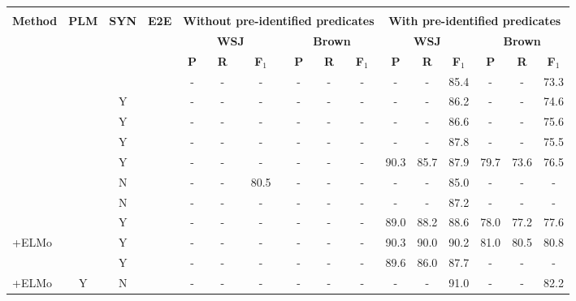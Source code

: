 

\begin{table*}[t]
\fontsize{8.5}{9}\selectfont
\setlength{\tabcolsep}{1.3mm}

\vspace{-2mm}
\begin{center}
\begin{tabular}{lccccccccccccccc}
\Xhline{0.08em}
\rowcolor{blue!15}
\multicolumn{16}{c}{\textit{\textbf{Dependency-based SRL}}} \\
\multirow{4}{*}{\bf Method} & \multirow{4}{*}{\bf PLM} & \multirow{4}{*}{\bf SYN} & \multirow{4}{*}{\bf E2E} & \multicolumn{6}{c}{\bf Without pre-identified predicates} & \multicolumn{6}{c}{\bf With pre-identified predicates}\\
\cmidrule(lr){5-10}\cmidrule(lr){11-16}
& & & & \multicolumn{3}{c}{\bf WSJ} & \multicolumn{3}{c}{\bf Brown} & \multicolumn{3}{c}{\bf WSJ} & \multicolumn{3}{c}{\bf Brown} \\
\cmidrule(lr){5-7}\cmidrule(lr){8-10}\cmidrule(lr){11-13}\cmidrule(lr){14-16}
 & & & & \bf P & \bf R & \bf F$_1$ & \bf P & \bf R & \bf F$_1$ & \bf P & \bf R & \bf F$_1$ & \bf P & \bf R & \bf F$_1$ \\
\hline
\citet{DBLP:conf/emnlp/ZhaoCK09} & & Y & & - & - & - & - & - & - & - & - & 85.4 & - & - & 73.3\\
\rowcolor{gray!15}
\citet{DBLP:conf/conll/ZhaoCKUT09} & & Y & & - & - & - & - & - & - & - & - & 86.2 & - & - & 74.6\\
\citet{DBLP:conf/naacl/LeiZVMB15} & & Y & & - & - & - & - & - & - & - & - & 86.6 & - & - & 75.6\\
\rowcolor{gray!15}
\citet{DBLP:conf/emnlp/FitzGeraldTG015} & & Y & & - & - & - & - & - & - & - & - & 87.8 & - & - & 75.5\\
\citet{DBLP:conf/acl/RothL16} & & Y & & - & - & - & - & - & - & 90.3 & 85.7 & 87.9 & 79.7 & 73.6 & 76.5 \\
\rowcolor{gray!15}
\citet{DBLP:conf/conll/SwayamdiptaBDS16} & & N & & - & - & 80.5 & - & - & - & - & - & 85.0 & - & - & -\\
\citet{DBLP:conf/acl/MulcaireSS18} & & N & & - & - & - & - & - & - & - & - & 87.2 & - & - & -\\
\rowcolor{gray!15}
\citet{DBLP:conf/naacl/KasaiFFRR19} & & Y & & - & - & - & - & - & - & 89.0 & 88.2 & 88.6 & 78.0 & 77.2 & 77.6\\
\rowcolor{gray!15}
\quad+ELMo & & Y & & - & - & - & - & - & - & 90.3 & 90.0 & 90.2 & 81.0 & 80.5 & 80.8\\
\citet{DBLP:conf/emnlp/ZhangWS19} & & Y & & - & - & - & - & - & - & 89.6 & 86.0 & 87.7 & - & - & - \\
\rowcolor{gray!15}
\citet{DBLP:conf/emnlp/LyuCT19}+ELMo & Y & N & & - & - & - & - & - & - & - & - & 91.0 & - & - & 82.2\\



\end{tabular}
\end{center}
\end{table*}
